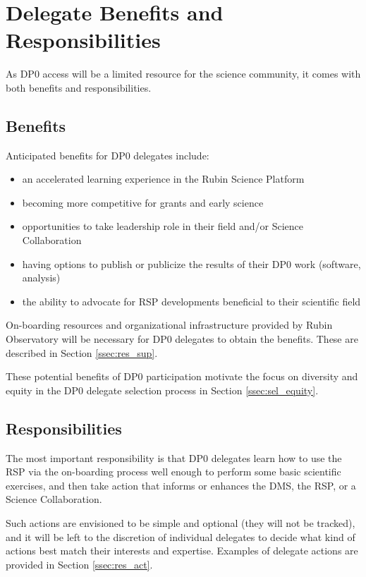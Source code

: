 \documentclass[DM,lsstdraft,authoryear,toc]{lsstdoc}
\begin{document}
\section{Delegate Benefits and Responsibilities}\label{sec:del}

As DP0 access will be a limited resource for the science community, it comes with both benefits and responsibilities.

\subsection{Benefits}\label{ssec:del_bene}

Anticipated benefits for DP0 delegates include:
\begin{itemize}
\item an accelerated learning experience in the Rubin Science Platform
\item becoming more competitive for grants and early science
\item opportunities to take leadership role in their field and/or Science Collaboration
\item having options to publish or publicize the results of their DP0 work (software, analysis)
\item the ability to advocate for RSP developments beneficial to their scientific field
\end{itemize}

On-boarding resources and organizational infrastructure provided by Rubin Observatory will be necessary for DP0 delegates to obtain the benefits. These are described in Section \ref{ssec:res_sup}.

These potential benefits of DP0 participation motivate the focus on diversity and equity in the DP0 delegate selection process in Section \ref{ssec:sel_equity}.

\subsection{Responsibilities}\label{ssec:del_resp}

The most important responsibility is that DP0 delegates learn how to use the RSP via the on-boarding process well enough to perform some basic scientific exercises, and then take action that informs or enhances the DMS, the RSP, or a Science Collaboration. 

Such actions are envisioned to be simple and optional (they will not be tracked), and it will be left to the discretion of individual delegates to decide what kind of actions best match their interests and expertise.
Examples of delegate actions are provided in Section \ref{ssec:res_act}.
\end{document}
